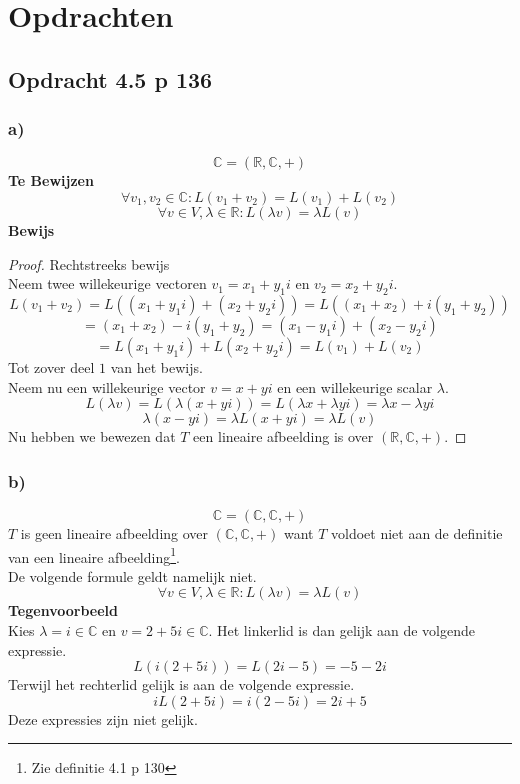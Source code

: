 \documentclass[lineaire_algebra_oplossingen.tex]{subfiles}
\begin{document}
\section{Opdrachten}

\subsection{Opdracht 4.5 p 136}
\label{4.5}
\subsubsection*{a)}
\[
\mathbb{C} = (\mathbb{R},\mathbb{C},+)
\]
\textbf{Te Bewijzen}\\
\[
\forall v_1,v_2 \in \mathbb{C}: L(v_1+v_2) = L(v_1)+L(v_2) 
\]
\[
\forall v\in V, \lambda \in \mathbb{R}: L(\lambda v) = \lambda L(v)
\]
\textbf{Bewijs}\\
\begin{proof}
Rechtstreeks bewijs\\
Neem twee willekeurige vectoren $v_1 = x_1+y_1i$ en $v_2=x_2+y_2i$.
\[
L(v_1+v_2)=L( (x_1+y_1i) + (x_2+y_2i)) = L((x_1+x_2) + i(y_1+y_2))
\]
\[
= (x_1+x_2)-i(y_1+y_2) = (x_1-y_1i) + (x_2-y_2i)
\]
\[
= L(x_1+y_1i) + L(x_2+y_2i) = L(v_1)+L(v_2)
\]
Tot zover deel $1$ van het bewijs.\\
Neem nu een willekeurige vector $v=x+yi$ en een willekeurige scalar $\lambda$.
\[
L(\lambda v) = L(\lambda (x+yi)) = L(\lambda x + \lambda yi) = \lambda x - \lambda yi
\]
\[
\lambda (x-yi) = \lambda L(x+yi) = \lambda L(v)
\]
Nu hebben we bewezen dat $T$ een lineaire afbeelding is over $(\mathbb{R},\mathbb{C},+)$.
\end{proof}

\subsubsection*{b)}
\[
\mathbb{C} = (\mathbb{C},\mathbb{C},+)
\]
$T$ is geen lineaire afbeelding over $(\mathbb{C},\mathbb{C},+)$ want $T$ voldoet niet aan de definitie van een lineaire afbeelding\footnote{Zie definitie 4.1 p 130}. \\
De volgende formule geldt namelijk niet.
\[\forall v\in V, \lambda \in \mathbb{R}: L(\lambda v) = \lambda L(v)\]
\textbf{Tegenvoorbeeld}\\
Kies $\lambda = i \in \mathbb{C}$ en $v = 2+5i\in \mathbb{C}$.
Het linkerlid is dan gelijk aan de volgende expressie.
\[
L(i(2+5i)) = L(2i-5) = -5 -2i
\]
Terwijl het rechterlid gelijk is aan de volgende expressie.
\[
iL(2+5i) = i(2-5i) = 2i+5
\]
Deze expressies zijn niet gelijk.
\end{document}
